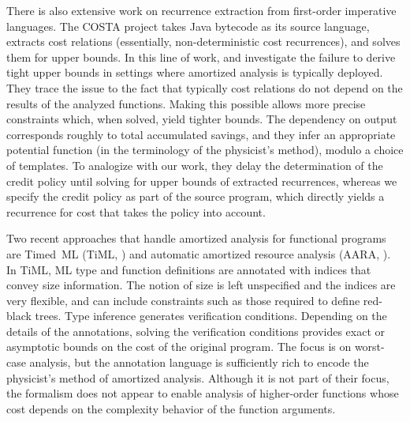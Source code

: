 There is also extensive work on recurrence extraction from first-order
imperative languages.  The COSTA project
\citep{albert-et-al:jar11,albert-et-al:tcs12:cost-analysis,albert-et-al:tocl13:inference}
takes Java bytecode as its source language, extracts cost relations
(essentially, non-deterministic cost recurrences), and solves them for upper
bounds.  In this line of work, \citet{alonso-blas-genaim:sas12} and
\citet{flores-montoya:fm16} investigate the failure to derive tight upper
bounds in settings where amortized analysis is typically deployed.  They
trace the issue to the fact that typically cost relations do not depend on
the results of the analyzed functions.
Making this possible allows more
precise constraints which, when solved, yield tighter bounds.  The
dependency on output corresponds roughly to total accumulated savings,
and they infer an appropriate potential function (in the terminology of the
physicist's method),
modulo a choice of templates.
To analogize with our work, they delay the determination of the credit
policy until solving for upper bounds of extracted recurrences, whereas we
specify the credit policy as part of the source program, which directly
yields a recurrence for cost that takes the policy into account.


Two recent approaches that handle amortized analysis for functional programs
are Timed~ML (TiML, \cite{wang-et-al:oopsla17:timl}) and automatic amortized
resource analysis (AARA,
\cite{hoffmann-et-al:toplas12:multivariate-amortized,hoffmann-shao:esop15:parallel,hoffmann-et-al:popl17,niu-hoffmann:lpar18}).
In TiML, ML type and function definitions are annotated with indices that
convey size information.  The notion of size is left unspecified and
the indices are very flexible, and can
include constraints such as those required to define red-black trees.  Type
inference generates verification conditions.  Depending on the details of
the annotations, solving the verification conditions provides exact or
asymptotic bounds on the cost of the original program.  The focus is on
worst-case analysis, but the annotation language is sufficiently rich to
encode the physicist's method of amortized analysis.  Although it is not
part of their focus, the formalism does not appear to enable analysis of
higher-order functions whose cost depends on the complexity behavior of the
function arguments.

